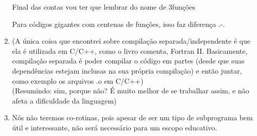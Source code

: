 \documentclass[12pt, a4paper]{article}
\begin{document}
\begin{enumerate}
			\begin{comment}
            Com sobrecarga:
            
            	int soma(int a, int b)
            {
            return a+b;
            }
            	
            	float soma(float a, float b)
            {
            return a+b;
            }
            
            	int soma(String a, String b)
            {
            return a^b;
            }
            
            	Final das contas, posso lembrar o nome de apenas uma função e fazer:
            
            	soma(1, 2);
            	soma(1.5, 2.5);
            	soma(“teste”, “ ftw”);	
            
            	Sem sobrecarga:
            	
            	int somaInt(int a, int b)
            {
            return a+b;
            }
            	
            	float somaFloat(float a, float b)
            {
            return a+b;
            }
            
            	int somaString(String a, String b)
            {
            return a^b;
            }
            \end{comment}
            	Final das contas vou ter que lembrar do nome de 3funções
            
            	Para códigos gigantes com centenas de funções, isso faz diferença .-.

            \item
            (A única coisa que encontrei sobre compilação separada/independente é que ela é utilizada em  C/C++, como o livro comenta, Fortran II. Basicamente, compilação separada é poder compilar o código em partes (desde que suas dependências estejam inclusas na sua própria compilação) e então juntar, como exemplo os arquivos .o em C/C++)
            \\
            (Resumindo: sim, porque não? É muito melhor de se trabalhar assim, e não afeta a dificuldade da linguagem)
            \item
            Nós não teremos co-rotinas, pois apesar de ser um tipo de subprograma bem útil e interessante, não será necessário para um escopo educativo.
        \end{enumerate}
\end{document}
